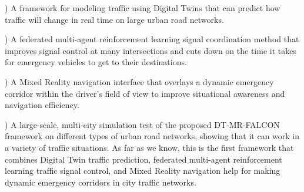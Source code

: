 \documentclass[conference]{IEEEtran}
\begin{document}
) A framework for modeling traffic using Digital Twins that can predict how traffic will change in real time on large urban road networks.

) A federated multi-agent reinforcement learning signal coordination method that improves signal control at many intersections and cuts down on the time it takes for emergency vehicles to get to their destinations.

) A Mixed Reality navigation interface that overlays a dynamic emergency corridor within the driver’s field of view to improve situational awareness and navigation efficiency.

) A large-scale, multi-city simulation test of the proposed DT-MR-FALCON framework on different types of urban road networks, showing that it can work in a variety of traffic situations.
\noindent As far as we know, this is the first framework that combines Digital Twin traffic prediction, federated multi-agent reinforcement learning traffic signal control, and Mixed Reality navigation help for making dynamic emergency corridors in city traffic networks.
\end{document}
